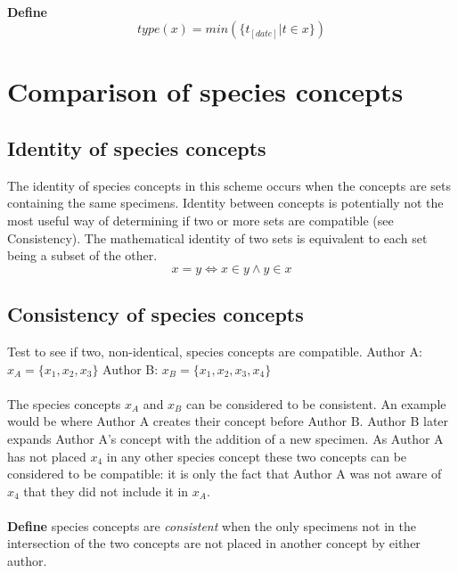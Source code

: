 \documentclass{article}
\begin{document}
   \paragraph{}
   \textbf{Define}
   \[type(x) = min(\{t_{[date]}|t \in x\}) \]
   
   \section{Comparison of species concepts}
   \subsection{Identity of species concepts}
   The identity of species concepts in this scheme occurs when the concepts are sets containing the same specimens. Identity between concepts is potentially not the most useful way of determining if two or more sets are compatible (see Consistency). The mathematical identity of two sets is equivalent to each set being a subset of the other.
   \[x = y \iff x \in y \land y \in x\]
   
   \subsection{Consistency of species concepts}
   Test to see if two, non-identical, species concepts are compatible.
   \newline\newline
   Author A: $x_A = \{x_1, x_2, x_3\}$ \newline
   Author B: $x_B = \{x_1, x_2, x_3, x_4\}$ 
   \paragraph{}
   The species concepts $x_A$ and $x_B$ can be considered to be consistent. An example would be where Author A creates their concept before Author B. Author B later expands Author A's concept with the addition of a new specimen. As Author A has not placed $x_4$ in any other species concept these two concepts can be considered to be compatible: it is only the fact that Author A was not aware of $x_4$ that they did not include it in $x_A$.
   \paragraph{}
   \textbf{Define}  species concepts are \textit{consistent} when the only specimens not in the intersection of the two concepts are not placed in another concept by either author.
\end{document}
